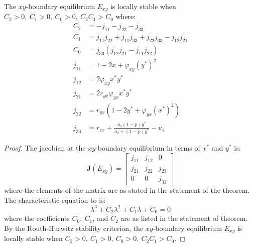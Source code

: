 \begin{theorem}\label{thm:boundary-xy-stability}
    The $xy$-boundary equilibrium $E_{xy}$ is locally stable when $C_2>0,\ C_1>0,\ C_0>0,\ C_2C_1>C_0$ where:
    \begin{align*}
        C_2 &= -j_{11}-j_{22}-j_{33}\\
        C_1 &= j_{11}j_{22}+j_{11}j_{33}+j_{22}j_{33}-j_{12}j_{21}\\
        C_0 &= j_{33}\left(j_{12}j_{21}-j_{11}j_{22}\right)\\
        j_{11} &= 1-2x+\varphi_{xy}\left(y^*\right)^2\\
        j_{12} &= 2\varphi_{xy}x^*y^*\\
        j_{21} &= 2r_{yx}\varphi_{yx}x^*y^*\\
        j_{22} &= r_{yx}\left(1-2y^*+\varphi_{yx}\left(x^*\right)^2\right)\\
        j_{33} &= r_{zx}+\frac{u_3\left(1-p\right)y^*}{u_2+\left(1-p\right)y^*}-u_4
    \end{align*}
\end{theorem}
\begin{proof}
    The jacobian at the $xy$-boundary equilibrium in terms of $x^*$ and $y^*$ is:
    \begin{equation}\label{matrix:jacobian-boundary-xy}
        \textbf{J}\left(E_{xy}\right) = \begin{bmatrix}
            j_{11} & j_{12} & 0\\
            j_{21} & j_{22} & j_{23}\\
            0 & 0 & j_{33}
        \end{bmatrix}
    \end{equation}
    where the elements of the matrix are as stated in the statement of the theorem. The characteristic equation to  is:
    \begin{equation*}\label{eq:char-eq-xy}
        \lambda^3+C_2\lambda^2+C_1\lambda+C_0=0
    \end{equation*}
    where the coefficients $C_0,\ C_1$, and $C_2$ are as listed in the statement of theorem. By the Routh-Hurwitz stability criterion, the $xy$-boundary equilibrium $E_{xy}$ is locally stable when $C_2>0,\ C_1>0,\ C_0>0,\ C_2C_1>C_0$.
\end{proof}

